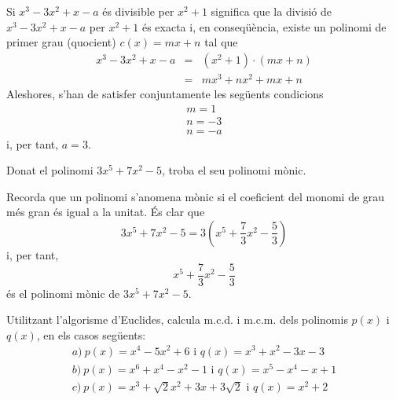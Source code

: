\begin{solucio}
Si $x^{3}-3x^{2}+x-a$ és divisible per $x^{2}+1$ significa que la divisió de $x^{3}-3x^{2}+x-a$ per $x^{2}+1$ és exacta i, en conseqüència, existe
un polinomi de primer grau (quocient) $c(x)=mx+n$ tal que\begin{eqnarray*}
x^{3}-3x^{2}+x-a &=&(x^{2}+1)\cdot (mx+n) \\
&=&mx^{3}+nx^{2}+mx+n
\end{eqnarray*}Aleshores, s'han de satisfer conjuntamente les següents condicions\[
\begin{array}{c}
m=1 \\
n=-3 \\
n=-a\end{array}\]i, per tant, $a=3$.
\end{solucio}

\begin{exercici}
Donat el polinomi $3x^{5}+7x^{2}-5$, troba el seu polinomi mònic.
\end{exercici}

\begin{solucio}
Recorda que un polinomi s’anomena mònic si el coeficient del monomi
de grau més gran és igual a la unitat. És clar que\[
3x^{5}+7x^{2}-5=3\left( x^{5}+\frac{7}{3}x^{2}-\frac{5}{3}\right)
\]i, per tant,\[
x^{5}+\frac{7}{3}x^{2}-\frac{5}{3}
\]és el polinomi mònic de $3x^{5}+7x^{2}-5$.
\end{solucio}

\begin{exercici}
Utilitzant l'algorisme d'Euclides, calcula m.c.d. i m.c.m. dels
polinomis $p(x)$ i $q(x)$, en els casos següents:\[
\begin{array}{l}
a)~p(x)=x^{4}-5x^{2}+6\text{ i }q(x)=x^{3}+x^{2}-3x-3 \\
b)~p(x)=x^{6}+x^{4}-x^{2}-1\text{ i }q(x)=x^{5}-x^{4}-x+1 \\
c)~p(x)=x^{3}+\sqrt{2}x^{2}+3x+3\sqrt{2}\text{ i }q(x)=x^{2}+2\end{array}\]
\end{exercici}

